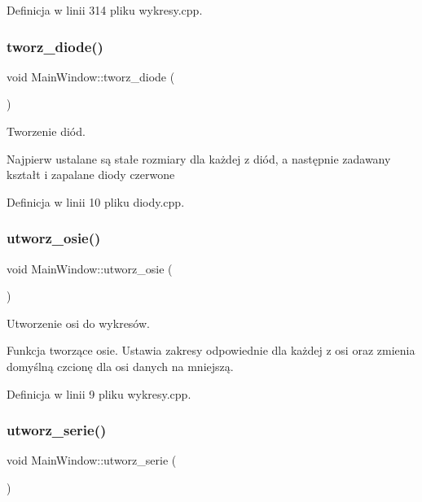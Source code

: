 Definicja w linii 314 pliku wykresy.\+cpp.

\mbox{\label{class_main_window_a39f01fe1c593f844a0c531b872ee0d7c}} 
\subsubsection{\texorpdfstring{tworz\+\_\+diode()}{tworz\_diode()}}
{\footnotesize\ttfamily void Main\+Window\+::tworz\+\_\+diode (\begin{DoxyParamCaption}{ }\end{DoxyParamCaption})}



Tworzenie diód. 

Najpierw ustalane są stałe rozmiary dla każdej z diód, a następnie zadawany kształt i zapalane diody czerwone 

Definicja w linii 10 pliku diody.\+cpp.

\mbox{\label{class_main_window_a94be5a5d63c0b8f071923a32f0215198}} 
\subsubsection{\texorpdfstring{utworz\+\_\+osie()}{utworz\_osie()}}
{\footnotesize\ttfamily void Main\+Window\+::utworz\+\_\+osie (\begin{DoxyParamCaption}{ }\end{DoxyParamCaption})}



Utworzenie osi do wykresów. 

Funkcja tworzące osie. Ustawia zakresy odpowiednie dla każdej z osi oraz zmienia domyślną czcionę dla osi danych na mniejszą. 

Definicja w linii 9 pliku wykresy.\+cpp.

\mbox{\label{class_main_window_a7c108455f05b3e2532088b38870e2ca2}} 
\subsubsection{\texorpdfstring{utworz\+\_\+serie()}{utworz\_serie()}}
{\footnotesize\ttfamily void Main\+Window\+::utworz\+\_\+serie (\begin{DoxyParamCaption}{ }\end{DoxyParamCaption})}



